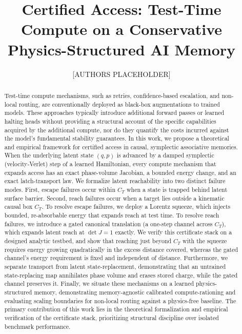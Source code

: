 \documentclass{article}
\title{Certified Access: Test-Time Compute on a Conservative Physics-Structured AI Memory}
\author{[AUTHORS PLACEHOLDER]}
\date{}
\newcommand{\detJ}{\det J}
\begin{document}
\sloppy
\maketitle

\begin{abstract}
Test-time compute mechanisms, such as retries, confidence-based escalation, and non-local routing, are conventionally deployed as black-box augmentations to trained models. These approaches typically introduce additional forward passes or learned halting heads without providing a structural account of the specific capabilities acquired by the additional compute, nor do they quantify the costs incurred against the model's fundamental stability guarantees. In this work, we propose a theoretical and empirical framework for certified access in causal, symplectic associative memories. When the underlying latent state $(q,p)$ is advanced by a damped symplectic (velocity-Verlet) step of a learned Hamiltonian, every compute mechanism that expands access has an exact phase-volume Jacobian, a bounded energy change, and an exact latch-transport law. We formalize latent reachability into two distinct failure modes. First, escape failures occur within $C_T$ when a state is trapped behind latent surface barrier. Second, reach failures occur when a target lies outside a kinematic causal box $C_T$. To resolve escape failures, we deploy a Lorentz squeeze, which injects bounded, re-absorbable energy that expands reach at test time. To resolve reach failures, we introduce a gated canonical translation (a one-step channel across $C_T$), which expands latent reach at $\detJ=1$ exactly. We verify this certificate stack on a designed analytic testbed, and show that reaching just beyond $C_T$ with the squeeze requires energy growing quadratically in the excess distance covered, whereas the gated channel's energy requirement is fixed and independent of distance. Furthermore, we separate transport from latent state-replacement, demonstrating that an untrained state-replacing map annihilates phase volume and erases stored charge, while the gated channel preserves it. Finally, we situate these mechanisms on a learned physics-structured memory, demonstrating memory-agnostic calibrated compute-rationing and evaluating scaling boundaries for non-local routing against a physics-free baseline. The primary contribution of this work lies in the theoretical formalization and empirical verification of the certificate stack, prioritizing structural discipline over isolated benchmark performance.
\end{abstract}
\end{document}
